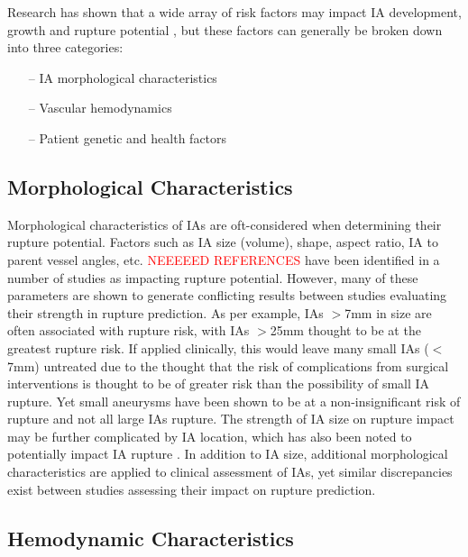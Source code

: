 Research has shown that a wide array of risk factors may impact IA development, growth and rupture potential \cite{Korja2014,penn2014role,starke2014tumor,diagbouga2018role}, but these factors can generally be broken down into three categories:
	\begin{itemize}
  		\item[--] IA morphological characteristics
 	    \item[--] Vascular hemodynamics
 	    \item[--] Patient genetic and health factors
	\end{itemize}

\subsection{Morphological Characteristics}

Morphological characteristics of IAs are oft-considered when determining their rupture potential. Factors such as IA size (volume), shape, aspect ratio, IA to parent vessel angles, etc. \textcolor{red}{NEEEEED REFERENCES} have been identified in a number of studies as impacting rupture potential. However, many of these parameters are shown to generate conflicting results between studies evaluating their strength in rupture prediction. As per example, IAs $>$7mm in size are often associated with rupture risk, with IAs $>$25mm thought to be at the greatest rupture risk. If applied clinically, this would leave many small IAs ($<$7mm) untreated due to the thought that the risk of complications from surgical interventions is thought to be of greater risk than the possibility of small IA rupture. Yet small aneurysms have been shown to be at a non-insignificant risk of rupture \cite{duan2018morphological} and not all large IAs rupture. The strength of IA size on rupture impact may be further complicated by IA location, which has also been noted to potentially impact IA rupture \cite{ucas2012natrual,weir2002sizes}. In addition to IA size, additional morphological characteristics are applied to clinical assessment of IAs, yet similar discrepancies exist between studies assessing their impact on rupture prediction.

\subsection{Hemodynamic Characteristics}

